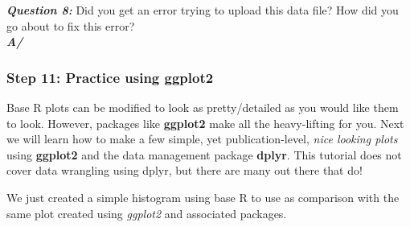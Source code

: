 \documentclass[]{article}
\newenvironment{Shaded}{\begin{snugshade}}{\end{snugshade}}
\newcommand{\CommentTok}[1]{\textcolor[rgb]{0.56,0.35,0.01}{\textit{#1}}}
\newcommand{\DataTypeTok}[1]{\textcolor[rgb]{0.13,0.29,0.53}{#1}}
\newcommand{\DecValTok}[1]{\textcolor[rgb]{0.00,0.00,0.81}{#1}}
\newcommand{\KeywordTok}[1]{\textcolor[rgb]{0.13,0.29,0.53}{\textbf{#1}}}
\newcommand{\NormalTok}[1]{#1}
\newcommand{\OperatorTok}[1]{\textcolor[rgb]{0.81,0.36,0.00}{\textbf{#1}}}
\newcommand{\StringTok}[1]{\textcolor[rgb]{0.31,0.60,0.02}{#1}}
\begin{document}
\textbf{\emph{Question 8:}} Did you get an error trying to upload this
data file? How did you go about to fix this error?\\
\textbf{\emph{A/}}

\begin{Shaded}
\end{Shaded}

\hypertarget{step-11-practice-using-ggplot2}{%
\subsubsection{Step 11: Practice using
ggplot2}\label{step-11-practice-using-ggplot2}}

Base R plots can be modified to look as pretty/detailed as you would
like them to look. However, packages like \textbf{ggplot2} make all the
heavy-lifting for you. Next we will learn how to make a few simple, yet
publication-level, \emph{nice looking plots} using \textbf{ggplot2} and
the data management package \textbf{dplyr}. This tutorial does not cover
data wrangling using dplyr, but there are many out there that do!

We just created a simple histogram using base R to use as comparison
with the same plot created using \emph{ggplot2} and associated packages.
\end{document}
